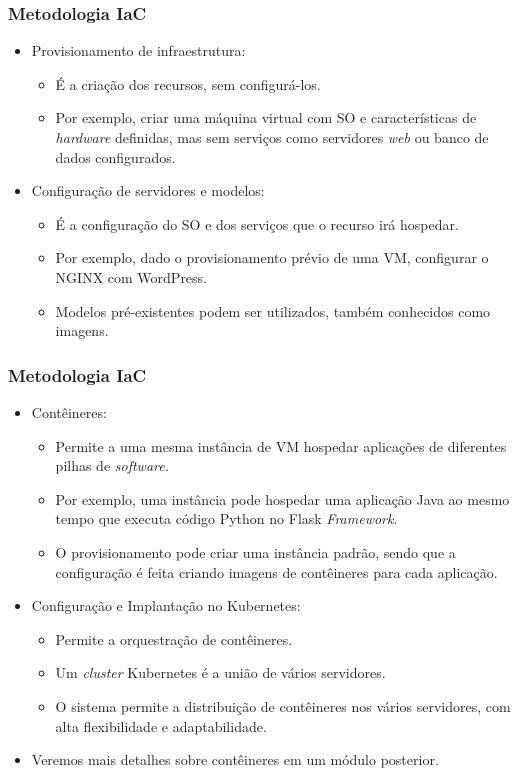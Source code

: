 \documentclass{beamer}
\begin{document}
   \begin{frame}
      \frametitle{Metodologia IaC}
      \begin{itemize}
      \item Provisionamento de infraestrutura:
      \begin{itemize}
      \item É a criação dos recursos, sem configurá-los.
      \item Por exemplo, criar uma máquina virtual com SO e características de \textit{hardware} definidas, mas sem serviços como servidores \textit{web }ou banco de dados configurados.
      \end{itemize}
      \item Configuração de servidores e modelos:
      \begin{itemize}
      \item É a configuração do SO e dos serviços que o recurso irá hospedar.
      \item Por exemplo, dado o provisionamento prévio de uma VM, configurar o NGINX com WordPress.
      \item Modelos pré-existentes podem ser utilizados, também conhecidos como imagens. 
      \end{itemize}
      \end{itemize}
   \end{frame}

   \begin{frame}
      \frametitle{Metodologia IaC}
      \begin{itemize}
      \item Contêineres:
      \begin{itemize}
      \item Permite a uma mesma instância de VM hospedar aplicações de diferentes pilhas de \textit{software.}
      \item Por exemplo, uma instância pode hospedar uma aplicação Java ao mesmo tempo que executa código Python no Flask \textit{Framework}.
      \item O provisionamento pode criar uma instância padrão, sendo que a configuração é feita criando imagens de contêineres para cada aplicação.
      \end{itemize}
      \item Configuração e Implantação no Kubernetes:
      \begin{itemize}
      \item Permite a orquestração de contêineres.
      \item Um \textit{cluster} Kubernetes é a união de vários servidores.
      \item O sistema permite a distribuição de contêineres nos vários servidores, com alta flexibilidade e adaptabilidade.
      \end{itemize}
      \item Veremos mais detalhes sobre contêineres em um módulo posterior. 
      \end{itemize}
   \end{frame}
\end{document}
